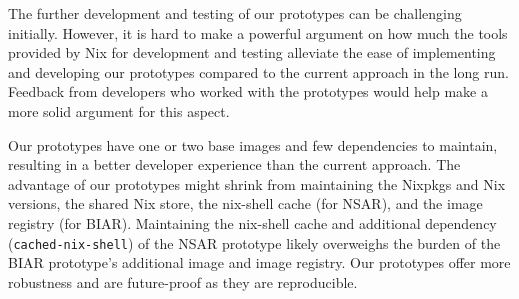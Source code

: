 The further development and testing of our prototypes can be challenging initially. However, it is hard to make a powerful argument on how much the tools provided by Nix for development and testing alleviate the ease of implementing and developing our prototypes compared to the current approach in the long run. Feedback from developers who worked with the prototypes would help make a more solid argument for this aspect.

Our prototypes have one or two base images and few dependencies to maintain, resulting in a better developer experience than the current approach. The advantage of our prototypes might shrink from maintaining the Nixpkgs and Nix versions, the shared Nix store, the nix-shell cache (for NSAR), and the image registry (for BIAR). Maintaining the nix-shell cache and additional dependency (\verb|cached-nix-shell|) of the NSAR prototype likely overweighs the burden of the BIAR prototype's additional image and image registry. Our prototypes offer more robustness and are future-proof as they are reproducible.
